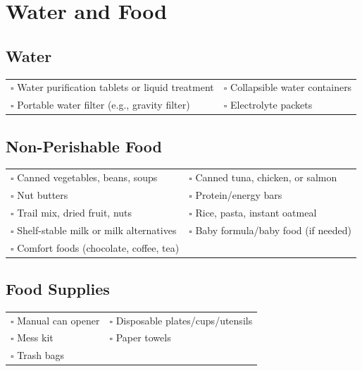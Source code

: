 
\section{Water and Food}
\label{sec:water}

\subsection{Water}

\begin{tabular}{p{9cm} p{9cm}}
$\square$ Water purification tablets or liquid treatment & $\square$ Collapsible water containers \\ 
$\square$ Portable water filter (e.g., gravity filter) & $\square$ Electrolyte packets \\ 
\end{tabular}

\subsection{Non-Perishable Food}

\begin{tabular}{p{9cm} p{9cm}}
$\square$ Canned vegetables, beans, soups & $\square$ Canned tuna, chicken, or salmon \\ 
$\square$ Nut butters & $\square$ Protein/energy bars \\ 
$\square$ Trail mix, dried fruit, nuts & $\square$ Rice, pasta, instant oatmeal \\ 
$\square$ Shelf-stable milk or milk alternatives & $\square$ Baby formula/baby food (if needed) \\ 
$\square$ Comfort foods (chocolate, coffee, tea) & \\ 
\end{tabular}

\subsection{Food Supplies}

\begin{tabular}{p{9cm} p{9cm}}
$\square$ Manual can opener & $\square$ Disposable plates/cups/utensils \\ 
$\square$ Mess kit & $\square$ Paper towels \\ 
$\square$ Trash bags & \\ 
\end{tabular}

